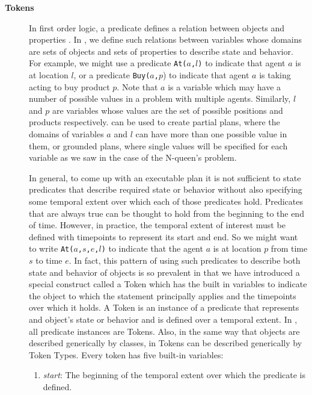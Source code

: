 \begin{description}
\item[\textbf{Tokens}] In first order logic, a predicate defines a
  relation between objects and properties .  In
  \eu, we define such relations between variables whose domains are
  sets of objects and sets of properties to describe state and
  behavior. For example, we might use a predicate \texttt{At($a$,$l$)}
  to indicate that agent $a$ is at location $l$, or a predicate
  \texttt{Buy($a$,$p$}) to indicate that agent $a$ is taking acting to
  buy product $p$. Note that $a$ is a variable which may have a number
  of possible values in a problem with multiple agents. Similarly, $l$
  and $p$ are variables whose values are the set of possible positions
  and products respectively. \eu can be used to create partial plans,
  where the domains of variables $a$ and $l$ can have more than one
  possible value in them, or grounded plans, where single values will
  be specified for each variable as we saw in the case of the
  N-queen's problem.

  In general, to come up with an executable plan it is not sufficient
  to state predicates that describe required state or behavior without
  also specifying some temporal extent over which each of those
  predicates hold. Predicates that are always true can be thought to
  hold from the beginning to the end of time. However, in practice,
  the temporal extent of interest must be defined with timepoints to
  represent its start and end. So we might want to write
  \texttt{At($a$,$s$,$e$,$l$)} to indicate that the agent $a$ is at
  location $p$ from time $s$ to time $e$. In fact, this pattern of
  using such predicates to describe both state and behavior of objects
  is so prevalent in \eu that we have introduced a special construct
  called a Token which has the built in variables to indicate the
  object to which the statement principally applies and the timepoints
  over which it holds. A Token is an instance of a predicate that
  represents and object's state or behavior and is defined over a
  temporal extent. In \eu, all predicate instances are Tokens. Also,
  in the same way that objects are described generically by classes,
  in \eu Tokens can be described generically by Token Types. Every
  token has five built-in variables:

  \begin{enumerate}

  \item \textit {start}: The beginning of the temporal extent over
    which the predicate is defined.


\end{enumerate}
\end{description}
